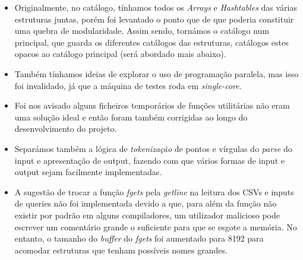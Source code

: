 \documentclass{article}
\begin{document}
            \begin{itemize}
                
                \item Originalmente, no catálogo, tínhamos todos os \textit{Arrays} e \textit{Hashtables} das 
                várias estruturas juntas, porém foi levantado o ponto que de que
                poderia constituir uma quebra de modularidade. Assim sendo, 
                tornámos o catálogo num principal, que guarda os diferentes
                catálogos das estruturas, catálogos estes opacos ao catálogo principal
                (será abordado mais abaixo).
                
                \item Também tínhamos ideias de explorar o uso de programação paralela,
                mas isso foi invalidado, já que a máquina de testes roda em \textit{single-core}.
    
                \item Foi nos avisado alguns ficheiros temporários de funções
                utilitárias não eram uma solução ideal e então foram também
                corrigidas ao longo do desenvolvimento do projeto.
    
                \item Separámos também a lógica de \textit{tokenização} de pontos e vírgulas
                do \textit{parse} do input e apresentação de output, fazendo com que
                vários formas de input e output sejam facilmente
                implementadas.
    
                \item A sugestão de trocar a função \textit{fgets} pela 
                \textit{getline} na leitura dos CSVs e inputs de queries 
                não foi implementada devido a que, para além da função não existir
                por padrão em alguns compiladores, um utilizador malicioso
                pode escrever um comentário grande o suficiente para que se 
                esgote a memória.
                No entanto, o tamanho do \textit{buffer} do \textit{fgets}
                foi aumentado para 8192 para acomodar estruturas
                que tenham possíveis nomes grandes.
                
            \end{itemize}
                        
\end{document}
